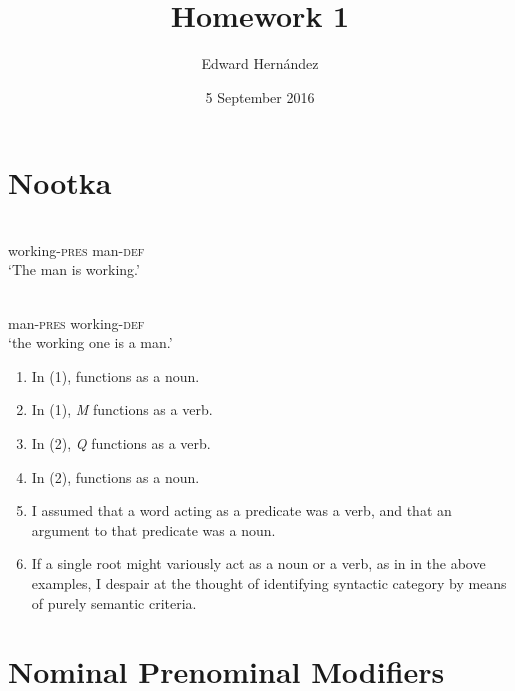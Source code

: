 \documentclass[doc,12pt,natbib]{apa6}
\begin{document}
\title{Homework 1}
\author{Edward Hern\'{a}ndez}
\date{5 September 2016}
\maketitle

\setcounter{secnumdepth}{3}

\section{Nootka}

\begin{exe}

	\ex 
	\gll {}  \\
	working-\textsc{pres} man-\textsc{def} \\
	\trans `The man is working.'

	\ex 
	\gll {}  \\
	man-\textsc{pres} working-\textsc{def} \\
	\trans `the working one is a man.'

\end{exe}


\begin{enumerate}

	\item In (1), \textit{} functions as a noun.
	\item In (1), \textit{M} functions as a verb.
	\item In (2), \textit{Q} functions as a verb.
	\item In (2), \textit{} functions as a noun.
	\item I assumed that a word acting as a predicate was a verb, and that an
		argument to that predicate was a noun.
	\item If a single root might variously act as a noun or a verb, as in in
		the above examples, I despair at the thought of identifying syntactic
		category by means of purely semantic criteria.

\end{enumerate}

\section{Nominal Prenominal Modifiers}
\end{document}
